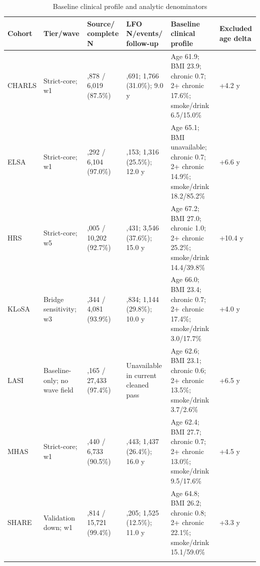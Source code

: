 \documentclass[pdflatex,sn-vancouver-num]{sn-jnl}
\begin{document}
\begin{table}[!htbp]
\singlespacing
\caption{Baseline clinical profile and analytic denominators}\label{tab:baseline-clinical}
\scriptsize
\setlength{\tabcolsep}{3pt}
\begin{tabular}{@{}>{\raggedright\arraybackslash}p{}>{\raggedright\arraybackslash}p{}>{\raggedright\arraybackslash}p{}>{\raggedright\arraybackslash}p{}>{\raggedright\arraybackslash}p{}>{\raggedright\arraybackslash}p{}@{}}
\toprule
Cohort & Tier/wave & Source/ complete N & LFO N/events/ follow-up & Baseline clinical profile & Excluded age delta\\
\midrule
CHARLS & Strict-core; w1 & 6,878 / 6,019 (87.5\%) & 5,691; 1,766 (31.0\%); 9.0 y & Age 61.9; BMI 23.9; chronic 0.7; 2+ chronic 17.6\%; smoke/drink 6.5/15.0\% & +4.2 y\\
ELSA & Strict-core; w1 & 6,292 / 6,104 (97.0\%) & 5,153; 1,316 (25.5\%); 12.0 y & Age 65.1; BMI unavailable; chronic 0.7; 2+ chronic 14.9\%; smoke/drink 18.2/85.2\% & +6.6 y\\
HRS & Strict-core; w5 & 11,005 / 10,202 (92.7\%) & 9,431; 3,546 (37.6\%); 15.0 y & Age 67.2; BMI 27.0; chronic 1.0; 2+ chronic 25.2\%; smoke/drink 14.4/39.8\% & +10.4 y\\
KLoSA & Bridge sensitivity; w3 & 4,344 / 4,081 (93.9\%) & 3,834; 1,144 (29.8\%); 10.0 y & Age 66.0; BMI 23.4; chronic 0.7; 2+ chronic 17.4\%; smoke/drink 3.0/17.7\% & +4.0 y\\
LASI & Baseline-only; no wave field & 28,165 / 27,433 (97.4\%) & Unavailable in current cleaned pass & Age 62.6; BMI 23.1; chronic 0.6; 2+ chronic 13.5\%; smoke/drink 3.7/2.6\% & +6.5 y\\
MHAS & Strict-core; w1 & 7,440 / 6,733 (90.5\%) & 5,443; 1,437 (26.4\%); 16.0 y & Age 62.4; BMI 27.7; chronic 0.7; 2+ chronic 13.0\%; smoke/drink 9.5/17.6\% & +4.5 y\\
SHARE & Validation down; w1 & 15,814 / 15,721 (99.4\%) & 12,205; 1,525 (12.5\%); 11.0 y & Age 64.8; BMI 26.2; chronic 0.8; 2+ chronic 22.1\%; smoke/drink 15.1/59.0\% & +3.3 y\\
\botrule
\end{tabular}
\end{table}
\end{document}
